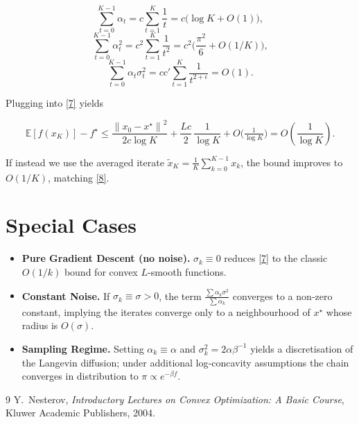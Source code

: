 \documentclass{article}
\newcommand{\E}{\mathbb{E}}
\newcommand{\norm}[1]{\left\|#1\right\|}
\begin{document}
\[
\sum_{t=0}^{K-1}\alpha_t = c\sum_{t=1}^{K}\frac{1}{t}=c\bigl(\log K+O(1)\bigr),
\]
\[
\sum_{t=0}^{K-1}\alpha_t^{2}=c^{2}\sum_{t=1}^{K}\frac{1}{t^{2}}=c^{2}\bigl(\frac{\pi^{2}}{6}+O(1/K)\bigr),
\]
\[
\sum_{t=0}^{K-1}\alpha_t\sigma_t^{2}=c c'\sum_{t=1}^{K}\frac{1}{t^{2+\epsilon}}=O(1).
\]

Plugging into \eqref{7} yields  

\[
\E[f(x_K)]-f^\star \le
\frac{\norm{x_0-x^\star}^{2}}{2c\log K}
+\frac{L c}{2}\,\frac{1}{\log K}
+ O\!\bigl(\tfrac{1}{\log K}\bigr)
=O\!\left(\frac{1}{\log K}\right).
\]

If instead we use the averaged iterate $\tilde x_K=\frac{1}{K}\sum_{k=0}^{K-1}x_k$, the bound improves to $O(1/K)$, matching \eqref{8}.

\section*{Special Cases}
\begin{itemize}
\item \textbf{Pure Gradient Descent (no noise).} $\sigma_k\equiv0$ reduces \eqref{7} to the classic $O(1/k)$ bound for convex $L$‑smooth functions.
\item \textbf{Constant Noise.} If $\sigma_k\equiv\sigma>0$, the term $\frac{\sum\alpha_k\sigma^{2}}{\sum\alpha_k}$ converges to a non‑zero constant, implying the iterates converge only to a neighbourhood of $x^\star$ whose radius is $O(\sigma)$.
\item \textbf{Sampling Regime.} Setting $\alpha_k\equiv\alpha$ and $\sigma_k^{2}=2\alpha\beta^{-1}$ yields a discretisation of the Langevin diffusion; under additional log‑concavity assumptions the chain converges in distribution to $\pi\propto e^{-\beta f}$.
\end{itemize}

\begin{thebibliography}{9}
Y.~Nesterov, \emph{Introductory Lectures on Convex Optimization: A Basic Course}, Kluwer Academic Publishers, 2004.
\end{thebibliography}
\end{document}
